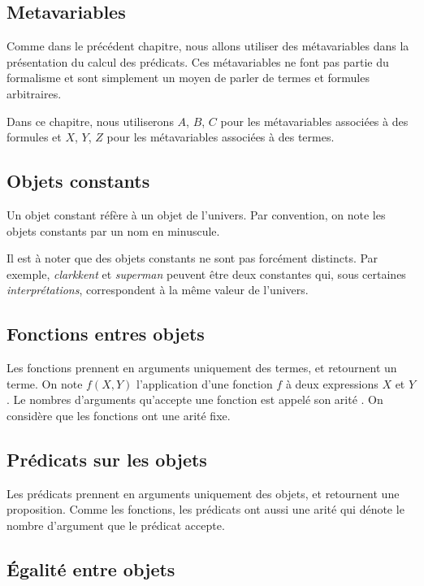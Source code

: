 \subsection{Metavariables}

Comme dans le précédent chapitre, nous allons utiliser des métavariables dans la présentation du calcul des prédicats.
Ces métavariables ne font pas partie du formalisme et sont simplement un moyen de parler de termes et formules arbitraires.

Dans ce chapitre, nous utiliserons $A$, $B$, $C$ pour les métavariables associées à des formules et $X$, $Y$, $Z$ pour les métavariables associées à des termes.

\subsection{Objets constants}

Un objet constant réfère à un objet de l'univers. Par convention, on note les objets constants par un nom en minuscule.

Il est à noter que des objets constants ne sont pas forcément distincts.
Par exemple, \textit{clarkkent} et \textit{superman} peuvent être deux constantes qui, sous certaines \textit{interprétations}, correspondent à la même valeur de l'univers.

\subsection{Fonctions entres objets}

Les fonctions prennent en arguments uniquement des termes, et retournent un terme.
On note $f(X, Y)$ l'application d'une fonction $f$ à deux expressions $X$ et $Y$.
Le nombres d'arguments qu'accepte une fonction est appelé son \og arité \fg{}.
On considère que les fonctions ont une arité fixe.

\subsection{Prédicats sur les objets}

Les prédicats prennent en arguments uniquement des objets, et retournent une proposition.
Comme les fonctions, les prédicats ont aussi une arité qui dénote le nombre d'argument que le prédicat accepte.

\subsection{Égalité entre objets}


